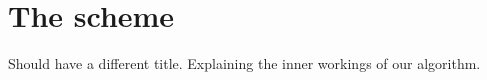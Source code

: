 \chapter{The scheme}

Should have a different title.
Explaining the inner workings of our algorithm.
